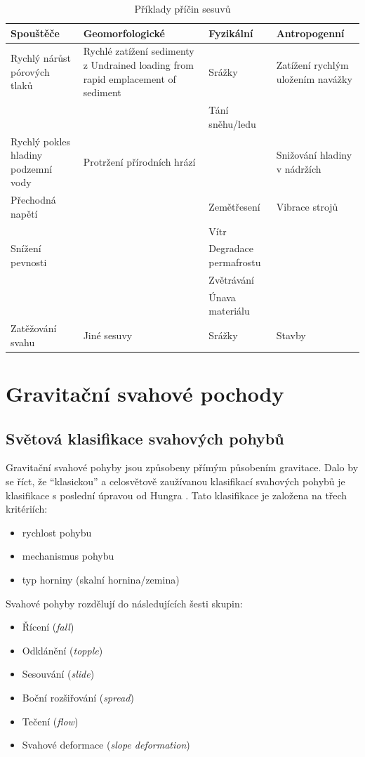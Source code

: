 \begin{table}
\begin{tabularx}{\textwidth}{@{}XXXX@{}}
		\midrule \midrule
		\textbf{Spouštěče} & \textbf{Geomorfologické} & \textbf{Fyzikální} & \textbf{Antropogenní} \\ 
		\midrule
		Rychlý nárůst pórových tlaků  & Rychlé zatížení sedimenty z Undrained loading from rapid emplacement of sediment & Srážky & Zatížení rychlým uložením navážky  \\
		&  &  Tání sněhu/ledu &  \\
		Rychlý pokles hladiny podzemní vody & Protržení přírodních hrází &  & Snižování hladiny v nádržích \\
		Přechodná napětí&  & Zemětřesení& Vibrace strojů \\
		&  & Vítr &  \\
		Snížení pevnosti&  & Degradace permafrostu &  \\
		&  & Zvětrávání &  \\
		&  & Únava materiálu &  \\
		Zatěžování svahu & Jiné sesuvy & Srážky & Stavby \\
		\bottomrule
	\end{tabularx}
		\caption{Příklady příčin sesuvů \parencite[podle][]{mccollLandslideCausesTriggers2015}}
		\label{tab:stabilita_faktory}
	
\end{table}

\section{Gravitační svahové pochody}

\subsection{Světová klasifikace svahových pohybů}
Gravitační svahové pohyby jsou způsobeny přímým působením gravitace. Dalo by se říct, že \enquote{klasickou} a celosvětově zaužívanou klasifikací svahových pohybů je klasifikace \textcite{crudenLandslideTypesProcesses1996} s poslední úpravou od Hungra \parencite*{hungrVarnesClassificationLandslide2014}. Tato klasifikace je založena na třech kritériích:
\begin{itemize}
	\item rychlost pohybu
	\item mechanismus pohybu
	\item typ horniny (skalní hornina/zemina)
\end{itemize}

Svahové pohyby rozdělují do následujících šesti skupin:
\begin{itemize}
	\item Řícení (\textit{fall})
	\item Odklánění (\textit{topple})
	\item Sesouvání (\textit{slide})
	\item Boční rozšiřování (\textit{spread})
	\item Tečení (\textit{flow})
	\item Svahové deformace (\textit{slope deformation})
\end{itemize}

